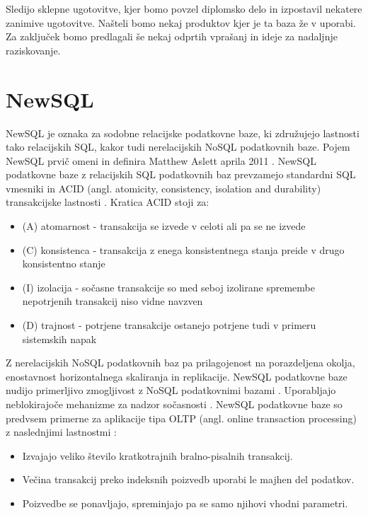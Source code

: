 \documentclass[a4paper, 12pt]{book}
\begin{document}
Sledijo sklepne ugotovitve, kjer bomo povzel diplomsko delo in izpostavil nekatere zanimive ugotovitve. Našteli bomo nekaj produktov kjer je ta baza že v uporabi. Za zaključek bomo predlagali še nekaj odprtih vprašanj in ideje za nadaljnje raziskovanje.


\chapter{NewSQL}
NewSQL je oznaka za sodobne relacijske podatkovne baze, ki združujejo lastnosti tako relacijskih SQL, kakor tudi nerelacijskih NoSQL podatkovnih baze. Pojem NewSQL prvič omeni in definira Matthew Aslett aprila 2011 \cite{Pavlo2016Sep}. NewSQL podatkovne baze z relacijskih SQL podatkovnih baz prevzamejo standardni SQL vmesniki in ACID (angl. atomicity, consistency, isolation and durability) transakcijske lastnosti \cite{oliveira2017newsql}. Kratica ACID stoji za:

\begin{itemize}
    \item (A) atomarnost - transakcija se izvede v celoti ali pa se ne izvede
    \item (C) konsistenca - transakcija z enega konsistentnega stanja preide v drugo konsistentno stanje
    \item (I) izolacija - sočasne transakcije so med seboj izolirane spremembe nepotrjenih transakcij niso vidne navzven
    \item (D) trajnost - potrjene transakcije ostanejo potrjene tudi v primeru sistemskih napak
\end{itemize}

\noindent Z nerelacijskih NoSQL podatkovnih baz pa prilagojenost na porazdeljena okolja, enostavnost horizontalnega skaliranja in replikacije. NewSQL podatkovne baze nudijo primerljivo zmogljivost z NoSQL podatkovnimi bazami \cite{oliveira2017newsql}. Uporabljajo neblokirajoče mehanizme za nadzor sočasnosti \cite{NewSQLNewWayToHandleBigData}. NewSQL podatkovne baze so predvsem primerne za aplikacije tipa OLTP (angl. online transaction processing) z naslednjimi lastnostmi \cite{Pavlo2016Sep}:
\begin{itemize}
    \item Izvajajo veliko število kratkotrajnih bralno-pisalnih transakcij.
    \item Večina transakcij preko indeksnih poizvedb uporabi le majhen del podatkov.
    \item Poizvedbe se ponavljajo, spreminjajo pa se samo njihovi vhodni parametri.
\end{itemize}
\end{document}

